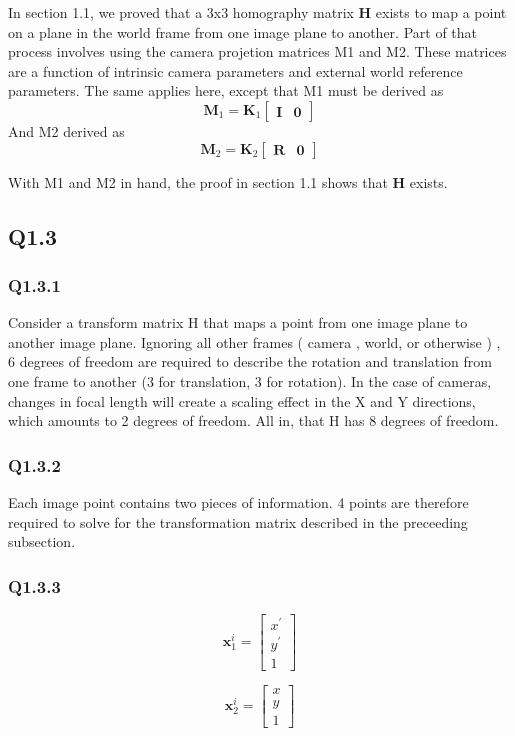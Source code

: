 \documentclass[12pt]{article}
\begin{document}
In section 1.1, we proved that a 3x3 homography matrix $\textbf{H}$ exists to map a point on a plane in the world frame from one image plane to another. Part of that process involves using the camera projetion matrices M1 and M2. These matrices are a function of intrinsic camera parameters and external world reference parameters.
The same applies here, except that M1 must be derived as  
$$
\textbf{M}_{1} = 
\textbf{K}_{1} 
\begin{bmatrix}
\textbf{I} & \textbf{0}
\end{bmatrix}
$$
And M2 derived as
$$
\textbf{M}_{2} = 
\textbf{K}_{2} 
\begin{bmatrix}
\textbf{R} & \textbf{0}
\end{bmatrix}
$$

With M1 and M2 in hand, the proof in section 1.1 shows that $\textbf{H}$ exists.

\subsection{Q1.3}
\subsubsection{Q1.3.1}
Consider a transform matrix H that maps a point from one image plane to another image plane. Ignoring all other frames ( camera , world, or otherwise ) , 6 degrees of freedom are required to describe the rotation and translation from one frame to another (3 for translation, 3 for rotation). In the case of cameras, changes in focal length will create a scaling effect in the X and Y directions, which amounts to 2 degrees of freedom. All in, that H has 8 degrees of freedom.
\subsubsection{Q1.3.2}
Each image point contains two pieces of information. 4 points are therefore required to solve for the transformation matrix described in the preceeding subsection.
\subsubsection{Q1.3.3}
$$
\textbf{x}^{i}_{1}=
\begin{bmatrix}
x^{ \prime } \\ y ^ { \prime } \\ 1
\end{bmatrix}
$$

$$
\textbf{x}^{i}_{2}=
\begin{bmatrix}
x \\ y \\ 1
\end{bmatrix}
$$
\end{document}
